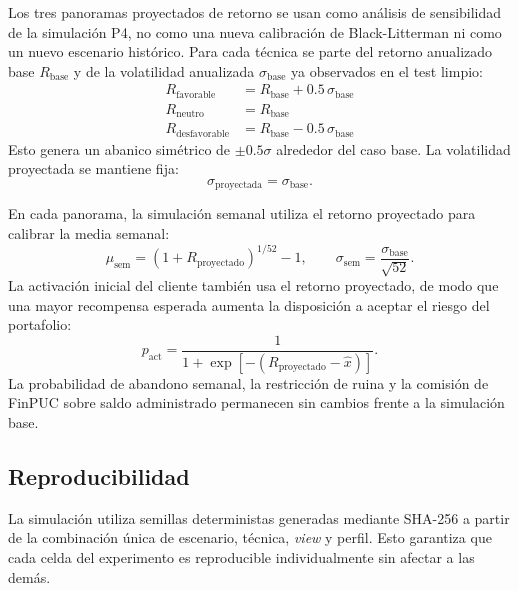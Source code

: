 Los tres panoramas proyectados de retorno se usan como an\'alisis de
sensibilidad de la simulaci\'on P4, no como una nueva calibraci\'on de
Black-Litterman ni como un nuevo escenario hist\'orico. Para cada t\'ecnica se
parte del retorno anualizado base $R_{\text{base}}$ y de la volatilidad
anualizada $\sigma_{\text{base}}$ ya observados en el test limpio:
\begin{align}
R_{\text{favorable}} &= R_{\text{base}} + 0.5\,\sigma_{\text{base}} \\
R_{\text{neutro}} &= R_{\text{base}} \\
R_{\text{desfavorable}} &= R_{\text{base}} - 0.5\,\sigma_{\text{base}}
\end{align}
Esto genera un abanico sim\'etrico de $\pm 0.5\sigma$ alrededor del caso
base. La volatilidad proyectada se mantiene fija:
\begin{equation}
\sigma_{\text{proyectada}} = \sigma_{\text{base}}.
\end{equation}

En cada panorama, la simulaci\'on semanal utiliza el retorno proyectado para
calibrar la media semanal:
\begin{equation}
\mu_{\text{sem}} = (1+R_{\text{proyectado}})^{1/52}-1,
\qquad
\sigma_{\text{sem}} = \frac{\sigma_{\text{base}}}{\sqrt{52}}.
\end{equation}
La activaci\'on inicial del cliente tambi\'en usa el retorno proyectado, de modo
que una mayor recompensa esperada aumenta la disposici\'on a aceptar el riesgo
del portafolio:
\begin{equation}
p_{\text{act}} =
\frac{1}{1+\exp[-(R_{\text{proyectado}}-\hat{x})]}.
\end{equation}
La probabilidad de abandono semanal, la restricci\'on de ruina y la comisi\'on
de FinPUC sobre saldo administrado permanecen sin cambios frente a la
simulaci\'on base.

\subsection{Reproducibilidad}

La simulaci\'on utiliza semillas deterministas generadas mediante SHA-256 a
partir de la combinaci\'on \'unica de escenario, t\'ecnica, \textit{view} y
perfil. Esto garantiza que cada celda del experimento es reproducible
individualmente sin afectar a las dem\'as.

